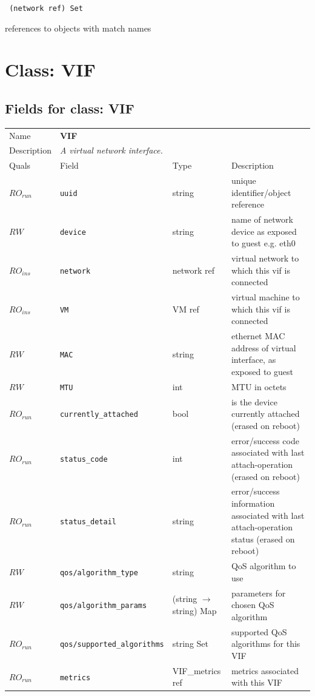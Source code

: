 \vspace{0.3cm}

{\tt 
(network ref) Set
}


references to objects with match names
\vspace{0.3cm}
\vspace{0.3cm}
\vspace{0.3cm}

\vspace{1cm}
\newpage
\section{Class: VIF}
\subsection{Fields for class: VIF}
\begin{longtable}{|lllp{}|}
\hline
\multicolumn{1}{|l}{Name} & \multicolumn{3}{l|}{\bf VIF} \\
\multicolumn{1}{|l}{Description} & \multicolumn{3}{l|}{\parbox{11cm}{\em A
virtual network interface.}} \\
\hline
Quals & Field & Type & Description \\
\hline
$\mathit{RO}_\mathit{run}$ &  {\tt uuid} & string & unique identifier/object reference \\
$\mathit{RW}$ &  {\tt device} & string & name of network device as exposed to guest e.g. eth0 \\
$\mathit{RO}_\mathit{ins}$ &  {\tt network} & network ref & virtual network to which this vif is connected \\
$\mathit{RO}_\mathit{ins}$ &  {\tt VM} & VM ref & virtual machine to which this vif is connected \\
$\mathit{RW}$ &  {\tt MAC} & string & ethernet MAC address of virtual interface, as exposed to guest \\
$\mathit{RW}$ &  {\tt MTU} & int & MTU in octets \\
$\mathit{RO}_\mathit{run}$ &  {\tt currently\_attached} & bool & is the device currently attached (erased on reboot) \\
$\mathit{RO}_\mathit{run}$ &  {\tt status\_code} & int & error/success code associated with last attach-operation (erased on reboot) \\
$\mathit{RO}_\mathit{run}$ &  {\tt status\_detail} & string & error/success information associated with last attach-operation status (erased on reboot) \\
$\mathit{RW}$ &  {\tt qos/algorithm\_type} & string & QoS algorithm to use \\
$\mathit{RW}$ &  {\tt qos/algorithm\_params} & (string $\rightarrow$ string) Map & parameters for chosen QoS algorithm \\
$\mathit{RO}_\mathit{run}$ &  {\tt qos/supported\_algorithms} & string Set & supported QoS algorithms for this VIF \\
$\mathit{RO}_\mathit{run}$ &  {\tt metrics} & VIF\_metrics ref & metrics associated with this VIF \\
\hline
\end{longtable}
